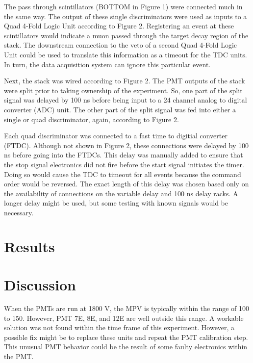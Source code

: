 \documentclass{article}
\begin{document}
The pass through scintillators (BOTTOM in Figure 1) were connected much in the same way. The output of these single discriminators were used as inputs to a Quad 4-Fold Logic Unit according to Figure 2. Registering an event at these scintillators would indicate a muon passed through the target decay region of the stack. The downstream connection to the veto of a second Quad 4-Fold Logic Unit could be used to translate this information as a timeout for the TDC units. In turn, the data acquisition system can ignore this particular event.

Next, the stack was wired according to Figure 2. The PMT outputs of the stack were split prior to taking ownership of the experiment. So, one part of the split signal was delayed by 100 ns before being input to a 24 channel analog to digital converter (ADC) unit. The other part of the split signal was fed into either a single or quad discriminator, again, according to Figure 2.

Each quad discriminator was connected to a fast time to digitial converter (FTDC). Although not shown in Figure 2, these connections were delayed by 100 ns before going into the FTDCs. This delay was manually added to ensure that the stop signal electronics did not fire before the start signal initiates the timer. Doing so would cause the TDC to timeout for all events because the command order would be reversed. The exact length of this delay was chosen based only on the availability of connections on the variable delay and 100 ns delay racks. A longer delay might be used, but some testing with known signals would be necessary.



\section*{Results}

\section*{Discussion}

\hspace{3.5mm} When the PMTs are run at 1800 V, the MPV is typically within the range of 100 to 150. However, PMT 7E, 8E, and 12E are well outside this range. A workable solution was not found within the time frame of this experiment. However, a possible fix might be to replace these units and repeat the PMT calibration step. This unusual PMT behavior could be the result of some faulty electronics within the PMT.
\end{document}
